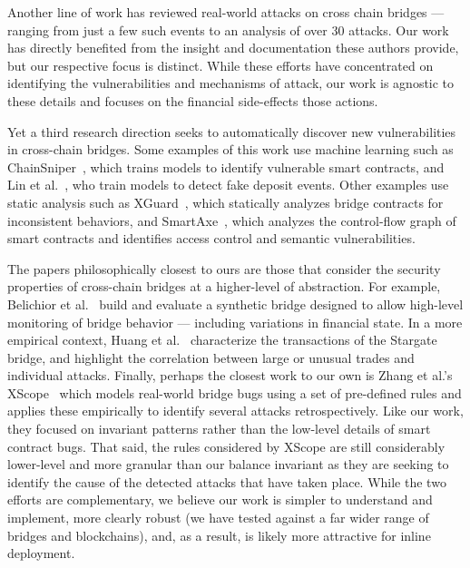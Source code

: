 Another line of work has reviewed real-world attacks on
cross chain
bridges\cite{lee2023sok,zhang2023sok,notland2024sok,zhao2023comprehensive}
--- ranging from just a few such events to an analysis of over 30
attacks.  Our work has directly benefited from the insight and
documentation these authors provide, but our respective focus is
distinct.  While these efforts have concentrated on identifying
the vulnerabilities and mechanisms of attack, our work is
agnostic to these details and focuses on the financial
side-effects those actions.

Yet a third research direction seeks to automatically discover new
vulnerabilities in cross-chain bridges.  Some examples of this work
use machine learning such as ChainSniper~\cite{tran2024chainsniper},
which trains models to identify vulnerable smart contracts, and Lin et
al.~\cite{lin2024detecting}, who train models to detect fake deposit
events.  Other examples use static analysis such as
XGuard~\cite{wang2024xguard}, which statically analyzes bridge
contracts for inconsistent behaviors, and
SmartAxe~\cite{liao2024smartaxe}, which analyzes the control-flow
graph of smart contracts and identifies access control and semantic
vulnerabilities.

The papers philosophically closest to ours are those that consider the
security properties of cross-chain bridges at a higher-level of
abstraction.  For example, Belichior et
al.~\cite{belchior2023hephaestus} build and evaluate a synthetic
bridge designed to allow high-level monitoring of bridge behavior --- including variations in financial state.  In
a more empirical context, Huang et al.~\cite{huang2024seamlessly}
characterize the transactions of the Stargate bridge, and highlight
the correlation between large or unusual trades and individual attacks.  Finally, perhaps the closest work to our own is Zhang et
al.'s XScope~\cite{zhang2022xscope} which models real-world bridge bugs using a set of
pre-defined rules and applies these empirically to identify several attacks retrospectively. Like our work, they focused on invariant patterns rather than the low-level details of
smart contract bugs. 
%
That said, the rules considered by XScope are still considerably lower-level and more granular than our balance invariant as they are seeking to identify the cause of the detected attacks that have taken place.
While the two efforts are complementary, we believe
our work is simpler to understand and implement, more clearly robust
(we have tested against a far wider range of bridges and blockchains),
and, as a result, is likely more attractive for inline deployment.



